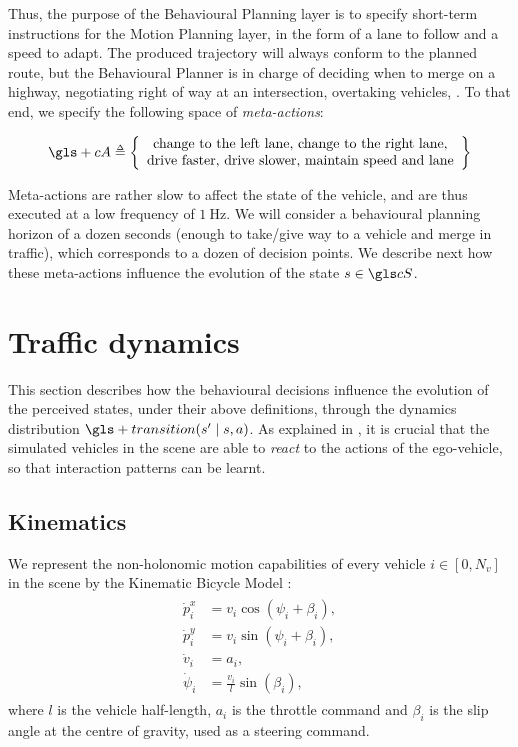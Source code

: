 Thus, the purpose of the Behavioural Planning layer is to specify short-term instructions for the Motion Planning layer, in the form of a lane to follow and a speed to adapt. The produced trajectory will always conform to the planned route, but the Behavioural Planner is in charge of \eg deciding when to merge on a highway, negotiating right of way at an intersection, overtaking vehicles, \etc. To that end, we specify the following space of \emph{meta-actions}:

\begin{equation}
\label{eq:action-space}
\gls+{cA} \eqdef \left\{ \begin{array}{c}
\text{change to the left lane},\, \text{change to the right lane}, \\
\text{drive faster},\, \text{drive slower},\, \text{maintain speed and lane}
\end{array}\right\}
\end{equation}

Meta-actions are rather slow to affect the state of the vehicle, and are thus executed at a low frequency of $\SI{1}{\hertz}$. We will consider a behavioural planning horizon of a dozen seconds (enough to \eg take/give way to a vehicle and merge in traffic), which corresponds to a dozen of decision points. We describe next how these meta-actions influence the evolution of the state $s\in\cS$.

\section{Traffic dynamics}

This section describes how the behavioural decisions influence the evolution of the perceived states, under their above definitions, through the dynamics distribution $\gls+{transition}\parentheses{s' \mid s,a}$. As explained in , it is crucial that the simulated vehicles in the scene are able to \emph{react} to the actions of the ego-vehicle, so that interaction patterns can be learnt.

\subsection{Kinematics}

We represent the non-holonomic motion capabilities of every vehicle $i\in[0, N_v]$ in the scene by the Kinematic Bicycle Model \citep[see \eg][]{Polack2017}:
\begin{align}
\begin{split}
\dot{p}^x_i &= v_i\cos(\psi_i + \beta_i), \\
\dot{p}^y_i &= v_i\sin(\psi_i + \beta_i),\\
\dot{v}_i &= a_i,\\
\dot{\psi}_i &= \frac{v_i}{l}\sin(\beta_i),
\end{split}
\end{align}
where $l$ is the vehicle half-length, $a_i$ is the throttle command and $\beta_i$ is the slip angle at the centre of gravity, used as a steering command.

